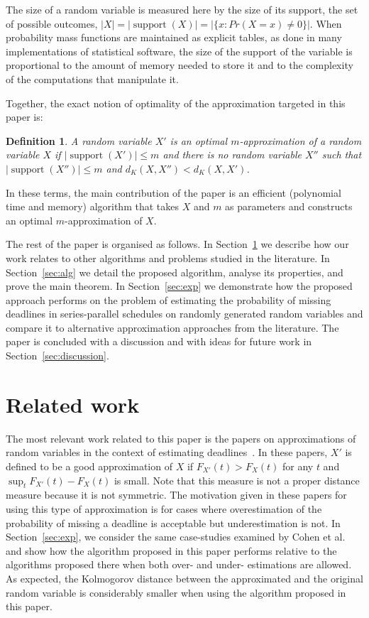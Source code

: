 \documentclass[letterpaper]{article} %
\newtheorem{definition}[thm]{Definition}
\DeclareMathOperator{\support}{support}
\begin{document}
The size of a random variable is measured here by the size of its support, the set of possible outcomes, $|X|=|\support(X)|=|\{x\colon Pr(X=x) \neq 0\}|$. When probability mass functions are maintained as explicit tables, as done in many implementations of statistical software, the size of the support of the variable is proportional to the amount of memory needed to store it and to the complexity of the computations that manipulate it. 

Together, the exact notion of optimality of the approximation targeted in this paper is:
\begin{definition}
	A random variable $X'$ is an optimal $m$-approximation of a random variable $X$ if $|\support(X')| \leq m$ and there is no random variable $X''$ such that $|\support(X'')| \leq m$ and $d_K(X,X'') < d_K(X,X')$.
\end{definition}

In these terms, the main contribution of the paper is an efficient (polynomial time and memory) algorithm that takes $X$ and $m$ as parameters and constructs an optimal $m$-approximation of $X$.

The rest of the paper is organised as follows. In Section~\ref{sec:relwork} we describe how our work relates to other algorithms and problems studied in the literature. In Section~\ref{sec:alg} we detail the proposed algorithm, analyse its properties, and prove the main theorem. In Section~\ref{sec:exp} we demonstrate how the proposed approach performs on the problem of estimating the probability of missing deadlines in series-parallel schedules on randomly generated random variables and compare it to alternative approximation approaches from the literature. The paper is concluded with a discussion and with ideas for future work in Section~\ref{sec:discussion}.

\section{Related work}\label{sec:relwork}
The most relevant work related to this paper is the papers on approximations of random variables in the context of estimating deadlines~\cite{cohen2015estimating,CohenGW18}. In these papers, $X'$ is defined to be a good approximation of $X$ if $F_{X'}(t) > F_{X}(t)$ for any $t$ and $\sup_t F_{X'}(t) - F_{X}(t)$ is small. Note that this measure is not a proper distance measure because it is not symmetric. The motivation given in these papers for using this type of approximation is for cases where overestimation of the probability of missing a deadline is acceptable but underestimation is not. In Section~\ref{sec:exp}, we consider the same case-studies examined by Cohen et al. and show how the algorithm proposed in this paper performs relative to the algorithms proposed there when both over- and under- estimations are allowed. As expected, the Kolmogorov distance between the approximated and the original random variable is considerably smaller when using the algorithm proposed in this paper. 
\end{document}
